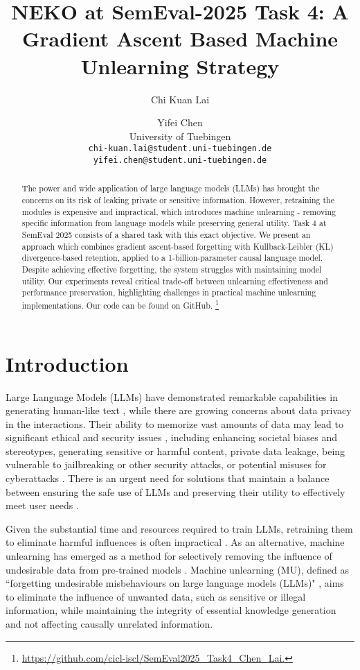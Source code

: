 \documentclass[11pt]{article}
\title{NEKO at SemEval-2025 Task 4: A Gradient Ascent Based Machine Unlearning Strategy}
\author{Chi Kuan Lai \and Yifei Chen \\
  University of Tuebingen \\
  \texttt{chi-kuan.lai@student.uni-tuebingen.de} \\
  \texttt{yifei.chen@student.uni-tuebingen.de} \\
  }
\begin{document}
\maketitle
\begin{abstract}
The power and wide application of large language models (LLMs) has brought the concerns on its risk of leaking private or sensitive information. However, retraining the modules is expensive and impractical, which introduces machine unlearning - removing specific information from language models while preserving general utility. Task 4 at SemEval 2025 consists of a shared task with this exact objective. We present an approach which combines gradient ascent-based forgetting with Kullback-Leibler (KL) divergence-based retention, applied to a 1-billion-parameter causal language model. Despite achieving effective forgetting, the system struggles with maintaining model utility. Our experiments reveal critical trade-off between unlearning effectiveness and performance preservation, highlighting challenges in practical machine unlearning implementations. Our code can be found on GitHub. \footnote{\url{https://github.com/cicl-iscl/SemEval2025_Task4_Chen_Lai.}}
\end{abstract}

\section{Introduction}

Large Language Models (LLMs) have demonstrated remarkable capabilities in generating human-like text \cite{touvron2023open}, while there are growing concerns about data privacy in the interactions. Their ability to memorize vast amounts of data may lead to significant ethical and security issues \cite{liu2025rethinking, Xu2023MachineUnlearning}, including enhancing societal biases and stereotypes, generating sensitive or harmful content, private data leakage, being vulnerable to jailbreaking or other security attacks, or potential misuses for cyberattacks \cite{Hendrycks2023, jang2022knowledge, marchant2022hard, motoki2024, singh2017data, wen2023, zou2023}. There is an urgent need for solutions that maintain a balance between ensuring the safe use of LLMs and preserving their utility to effectively meet user needs \cite{chen2023unlearn}.

Given the substantial time and resources required to train LLMs, retraining them to eliminate harmful influences is often impractical \cite{brown2020}. As an alternative, machine unlearning has emerged as a method for selectively removing the influence of undesirable data from pre-trained models \cite{nguyen2022survey}. Machine unlearning (MU), defined as ``forgetting undesirable misbehaviours on large language models (LLMs)" \cite{yao2023}, aims to eliminate the influence of unwanted data, such as sensitive or illegal information, while maintaining the integrity of essential knowledge generation and not affecting causally unrelated information\cite{bu2024}. 
\end{document}
